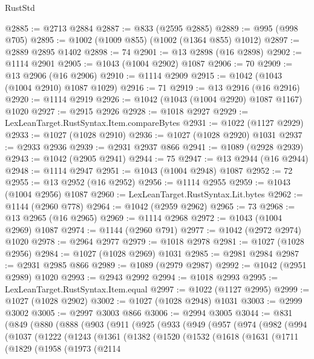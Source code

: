 \begin{lexlean}{RustStd}
\begin{coremodule}
{\begin{coremodule}
{{{{{{{{{{{{{{{{{{{{{{{{{{@2885 := @2713 @2884
@2887 := @833 (@2595 @2885)
@2889 := @995 (@998 @705)
@2895 := @1002 (@1009 @855) (@1002 (@1364 @855) @1012)
@2897 := @2889 @2895 @1402
@2898 := 74
@2901 := @13 @2898 (@16 @2898)
@2902 := @1114 @2901
@2905 := @1043 (@1004 @2902) @1087
@2906 := 70
@2909 := @13 @2906 (@16 @2906)
@2910 := @1114 @2909
@2915 := @1042 (@1043 (@1004 @2910) @1087 @1029)
@2916 := 71
@2919 := @13 @2916 (@16 @2916)
@2920 := @1114 @2919
@2926 := @1042 (@1043 (@1004 @2920) @1087 @1167) @1020
@2927 := @2915 @2926
@2928 := @1018 @2927
@2929 := LexLeanTarget.RustSyntax.Item.compareBytes
@2931 := @1022 (@1127 @2929)
@2933 := @1027 (@1028 @2910)
@2936 := @1027 (@1028 @2920) @1031
@2937 := @2933 @2936
@2939 := @2931 @2937 @866
@2941 := @1089 (@2928 @2939)
@2943 := @1042 (@2905 @2941)
@2944 := 75
@2947 := @13 @2944 (@16 @2944)
@2948 := @1114 @2947
@2951 := @1043 (@1004 @2948) @1087
@2952 := 72
@2955 := @13 @2952 (@16 @2952)
@2956 := @1114 @2955
@2959 := @1043 (@1004 @2956) @1087
@2960 := LexLeanTarget.RustSyntax.Lit.bytes
@2962 := @1144 (@2960 @778)
@2964 := @1042 (@2959 @2962)
@2965 := 73
@2968 := @13 @2965 (@16 @2965)
@2969 := @1114 @2968
@2972 := @1043 (@1004 @2969) @1087
@2974 := @1144 (@2960 @791)
@2977 := @1042 (@2972 @2974) @1020
@2978 := @2964 @2977
@2979 := @1018 @2978
@2981 := @1027 (@1028 @2956)
@2984 := @1027 (@1028 @2969) @1031
@2985 := @2981 @2984
@2987 := @2931 @2985 @866
@2989 := @1089 (@2979 @2987)
@2992 := @1042 (@2951 @2989) @1020
@2993 := @2943 @2992
@2994 := @1018 @2993
@2995 := LexLeanTarget.RustSyntax.Item.equal
@2997 := @1022 (@1127 @2995)
@2999 := @1027 (@1028 @2902)
@3002 := @1027 (@1028 @2948) @1031
@3003 := @2999 @3002
@3005 := @2997 @3003 @866
@3006 := @2994 @3005
@3044 := @831
    (@849
      (@880
        (@888
          (@903
            (@911
              (@925
                (@933
                  (@949
                    (@957
                      (@974
                        (@982
                          (@994
                            (@1037
                              (@1222
                                (@1243
                                  (@1361
                                    (@1382
                                      (@1520
                                        (@1532
                                          (@1618
                                            (@1631
                                              (@1711
                                                (@1829
                                                  (@1958
                                                    (@1973
                                                      (@2114
}}}}}}}}}}}}}}}}}}}}}}}}}}
\end{coremodule}}
\end{coremodule}
\end{lexlean}

